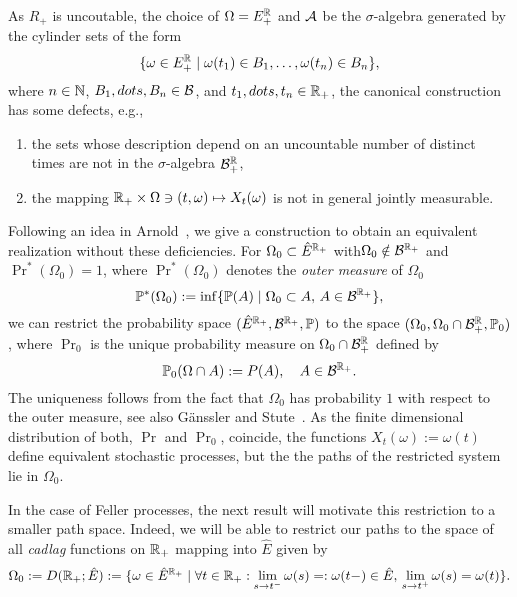 \documentclass[../Master.tex]{subfiles}
\begin{document}
As \(R_+\) is uncoutable, the choice of \(\Omega = E^{\mathbb{R}}_+\) and \(\mathcal{A}\) be the \(\sigma{}\)-algebra generated by the cylinder sets of the form
\begin{equation*}
  \{\omega \in E^{\mathbb{R}}_+ \mid \omega(t_1) \in B_1, \dots, \omega(t_n) \in B_n \},
\end{equation*}
where \(n \in \mathbb{N}{}\), \(B_1, dots, B_n \in \mathcal{B}\), and \(t_1, dots, t_n \in \mathbb{R}_+\), the canonical construction has some defects, e.g.,
\begin{enumerate}
  \item the sets whose description depend on an uncountable number of distinct times are not in the \(\sigma{}\)-algebra \(\mathcal{B}^{\mathbb{R}}_+\),
  \item the mapping \(\mathbb{R}_+ \times \Omega \ni (t,\omega) \mapsto X_t(\omega)\) is not in general jointly measurable.
\end{enumerate}

Following an idea in Arnold~\cite*[Appendix A.2]{arnold_random_1998}, we give a construction to obtain an equivalent realization without these deficiencies. For \(\Omega_0 \subset \hat{E}^{\mathbb{R}_+}\) with\(\Omega_0 \notin \mathcal{B}^{\mathbb{R}_+}\) and \(\Pr^*(\Omega_0) = 1\), where \(\Pr^*(\Omega_0)\) denotes the \emph{outer measure} of \(\Omega_0\)
\begin{equation}
  \mathbb{P}^*(\Omega_0) := \inf \{\mathbb{P}(A) \mid \Omega_0 \subset A, \, A \in \mathcal{B}^{\mathbb{R}_+}\},
\end{equation}
we can restrict the probability space \((\hat{E}^{\mathbb{R}_+}, \mathcal{B}^{\mathbb{R}_+}, \mathbb{P})\) to the space \((\Omega_0, \Omega_0 \cap \mathcal{B}^{\mathbb{R}}_+, \mathbb{P}_0)\), where \(\Pr_0\) is the unique probability measure on \(\Omega_0 \cap \mathcal{B}^{\mathbb{R}}_+\) defined by
\begin{equation*}
  \mathbb{P}_0(\Omega \cap A) := P(A), \quad A \in \mathcal{B}^{\mathbb{R}_+}.
\end{equation*}
The uniqueness follows from the fact that \(\Omega_0\) has probability \(1\) with respect to the outer measure, see also Gänssler and Stute~\cite[Theorem 7.1.18]{ganssler_wahrscheinlichkeitstheorie_1977}.
As the finite dimensional distribution of both, \(\Pr{}\) and \(\Pr_0\), coincide, the functions \(X_t(\omega) := \omega(t)\) define equivalent stochastic processes, but the the paths of the restricted system lie in \(\Omega_0\).

In the case of Feller processes, the next result will motivate this restriction to a smaller path space. Indeed, we will be able to restrict our paths to the space of all \emph{cadlag} functions on \(\mathbb{R}_+\) mapping into \(\hat{E}\) given by
\begin{equation}
  \Omega_0 := D(\mathbb{R}_+; \hat{E}) := \{\omega \in \hat{E}^{\mathbb{R}_+} \mid \forall t \in \mathbb{R}_+: \lim_{s \to t^-} \omega(s) =: \omega(t-) \in \hat{E}, \, \lim_{s \to t^+} \omega(s) = \omega(t)\}.
\end{equation}
\end{document}
